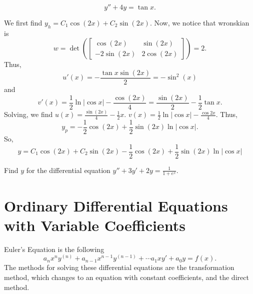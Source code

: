 \begin{example}
    $$y''+4y = \tan x.$$
\end{example}
\begin{soln}
    We first find $y_h = C_1\cos(2x)+C_2\sin(2x)$. Now, we notice that
    wronskian is 
    $$w = \det \left( \begin{bmatrix}\cos(2x)&\sin(2x) \\ -2\sin(2x) & 2\cos(2x) \end{bmatrix}\right)
    =2.$$ Thus, $$u'(x) = -\frac{\tan x \sin (2x)}{2} = -\sin^2(x)$$
    and $$v'(x) = \frac{1}{2}\ln |\cos x| - \frac{\cos(2x)}{4} = \frac{\sin(2x)}{2}-\frac{1}{2}\tan x.$$
    Solving, we find $u(x) = \frac{\sin(2x)}{4} - \frac{1}{2}x$. 
    $v(x) = \frac{1}{2}\ln |\cos x| - \frac{\cos 2x}{4}$. Thus,
    $$y_p = -\frac{1}{2}\cos(2x)+\frac{1}{2}\sin(2x)\ln |\cos x|.$$
    So, $$y = C_1\cos(2x)+C_2\sin(2x)-\frac{1}{2}\cos(2x)+\frac{1}{2}\sin(2x)\ln |\cos x|$$
\end{soln}
\begin{exercise}
    Find $y$ for the differential equation $y''+3y'+2y=\frac{1}{1+e^x}$.
\end{exercise}

\section{Ordinary Differential Equations with Variable Coefficients}
\alert{Euler's Equation} is the following
$$a_nx^ny^{(n)} + a_{n-1}x^{n-1}y^{(n-1)} + \cdots a_1xy'+a_0y = f(x).$$
The methods for solving these differential equations are the 
\alert{transformation method}, which changes to an equation with constant
coefficients, and the \alert{direct method}.

